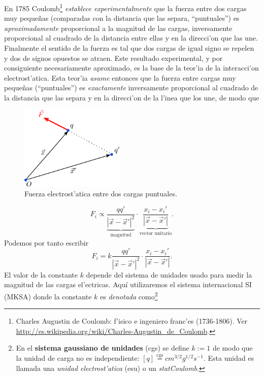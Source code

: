 En 1785 Coulomb\footnote{Charles Augustin de Coulomb: f'isico e ingeniero franc'es (1736-1806). Ver \url{http://es.wikipedia.org/wiki/Charles-Augustin_de_Coulomb}.} \textit{establece experimentalmente} que la fuerza entre dos cargas muy peque\~nas (comparadas con la distancia que las separa, ``puntuales'') es \textit{aproximadamente}  proporcional a la magnitud de las cargas, inversamente proporcional al cuadrado de la distancia entre ellas y en la direcci'on que las
une. Finalmente el sentido de la fuerza es tal que dos cargas de igual signo se repelen y dos de signos opuestos se atraen. Este resultado experimental, y por consiguiente necesariamente aproximado, es la base de la teor'ia de la interacci'on electrost'atica. Esta teor'ia \textit{asume} entonces que la fuerza entre cargas muy pequeñas (``puntuales'') es \textit{exactamente} inversamente proporcional al cuadrado de la distancia que las separa y en la direcci'on de la l'inea que los une, de modo que
\begin{center}
\begin{figure}[H]
\centerline{\includegraphics[height=4cm]{fig/fig-Coulomb.pdf}}
\caption{Fuerza electrost'atica entre dos cargas puntuales.}
\label{fig:Coulomb}
\end{figure}
\end{center}
\begin{equation}
F_i\propto \underbrace{\frac{qq'}{\left\vert \vec x-\vec
x'\right\vert^2}}_\text{magnitud}\cdot
\underbrace{\frac{x_i-x_i'}{\left\vert \vec x-\vec x'\right\vert }}_\text{vector unitario}.
\end{equation}
Podemos por tanto escribir
\begin{equation}
F_i=k\frac{qq'}{\left\vert \vec x-\vec x'\right\vert^2}
\cdot\frac{x_i-x_i'}{\left\vert \vec x-\vec x'\right\vert }.
\end{equation}
El valor de la constante $k$ depende del sistema de unidades usado para medir la magnitud de las cargas el'ectricas. Aquí utilizaremos el sistema internacional SI (MKSA) donde la constante $k$ es \textit{denotada} como\footnote{En el \textbf{sistema gaussiano de unidades} (cgs) se define $k:=1$ de modo que la unidad de carga no es independiente: $[q]\stackrel{\text{cgs}}{=}cm^{3/2}g^{1/2}s^{-1}$. Esta unidad es llamada una \textit{unidad electrost'atica} (esu) o un \textit{statCoulomb}.}%
